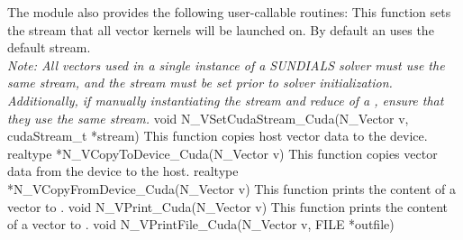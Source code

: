 The module {\nveccuda} also provides the following user-callable routines:
{
  This function sets the {\cuda} stream that all vector kernels will be launched on.
  By default an {\nveccuda} uses the default {\cuda} stream.\\

  \textit{Note: All vectors used in a single instance of a SUNDIALS solver must
  use the same {\cuda} stream, and the {\cuda} stream must be set prior to
  solver initialization. Additionally, if manually instantiating the stream and
  reduce  of a , ensure that they
  use the same {\cuda} stream.}
}
{
  void N\_VSetCudaStream\_Cuda(N\_Vector v, cudaStream\_t *stream)
}
{
 This function copies host vector data to the device.
}
{
 realtype *N\_VCopyToDevice\_Cuda(N\_Vector v)
}
{
 This function copies vector data from the device to the host.
}
{
 realtype *N\_VCopyFromDevice\_Cuda(N\_Vector v)
}
{
  This function prints the content of a {\cuda} vector to .
}
{
  void N\_VPrint\_Cuda(N\_Vector v)
}
{
  This function prints the content of a {\cuda} vector to .
}
{
  void N\_VPrintFile\_Cuda(N\_Vector v, FILE *outfile)
}

